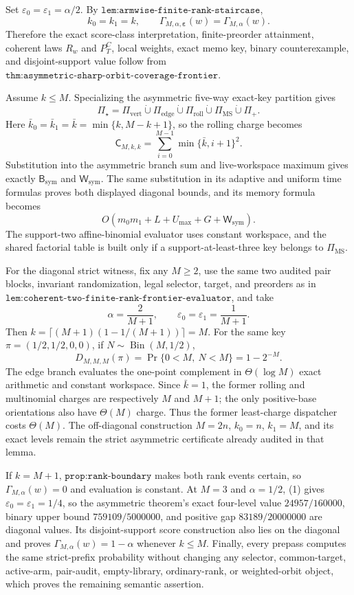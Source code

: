 Set \(\varepsilon_0=\varepsilon_1=\alpha/2\). By \(\texttt{lem:armwise-finite-rank-staircase}\),
\[
k_0=k_1=k,\qquad \Gamma_{M,\alpha,\boldsymbol\varepsilon}(w)=\Gamma_{M,\alpha}(w).
\tag{1}
\]
Therefore the exact score-class interpretation, finite-preorder attainment, coherent laws \(R_w\) and \(P_T^C\), local weights, exact memo key, binary counterexample, and disjoint-support value follow from \(\texttt{thm:asymmetric-sharp-orbit-coverage-frontier}\).

Assume \(k\le M\). Specializing the asymmetric five-way exact-key partition gives
\[
\Pi_\star=\Pi_{\mathrm{vert}}\mathbin{\dot\cup}\Pi_{\mathrm{edge}}\mathbin{\dot\cup}\Pi_{\mathrm{roll}}\mathbin{\dot\cup}\Pi_{\mathrm{MS}}\mathbin{\dot\cup}\Pi_+.
\tag{2}
\]
Here \(\bar k_0=\bar k_1=\bar k=\min\{k,M-k+1\}\), so the rolling charge becomes
\[
\mathsf C_{M,k,k}=\sum_{i=0}^{M-1}\min\{\bar k,i+1\}^2.
\tag{3}
\]
Substitution into the asymmetric branch sum and live-workspace maximum gives exactly \(\mathsf B_{\mathrm{sym}}\) and \(\mathsf W_{\mathrm{sym}}\). The same substitution in its adaptive and uniform time formulas proves both displayed diagonal bounds, and its memory formula becomes
\[
O(m_0m_1+L+U_{\max}+G+\mathsf W_{\mathrm{sym}}).
\tag{4}
\]
The support-two affine-binomial evaluator uses constant workspace, and the shared factorial table is built only if a support-at-least-three key belongs to \(\Pi_{\mathrm{MS}}\).

For the diagonal strict witness, fix any \(M\ge2\), use the same two audited pair blocks, invariant randomization, legal selector, target, and preorders as in \(\texttt{lem:coherent-two-finite-rank-frontier-evaluator}\), and take
\[
\alpha=\frac{2}{M+1},\qquad \varepsilon_0=\varepsilon_1=\frac1{M+1}.
\tag{5}
\]
Then \(k=\lceil(M+1)(1-1/(M+1))\rceil=M\). For the same key \(\pi=(1/2,1/2,0,0)\), if \(N\sim\operatorname{Bin}(M,1/2)\),
\[
D_{M,M,M}(\pi)=\Pr\{0<M,\ N<M\}=1-2^{-M}.
\tag{6}
\]
The edge branch evaluates the one-point complement in \(\Theta(\log M)\) exact arithmetic and constant workspace. Since \(\bar k=1\), the former rolling and multinomial charges are respectively \(M\) and \(M+1\); the only positive-base orientations also have \(\Theta(M)\) charge. Thus the former least-charge dispatcher costs \(\Theta(M)\). The off-diagonal construction \(M=2n\), \(k_0=n\), \(k_1=M\), and its exact levels remain the strict asymmetric certificate already audited in that lemma.

If \(k=M+1\), \(\texttt{prop:rank-boundary}\) makes both rank events certain, so \(\Gamma_{M,\alpha}(w)=0\) and evaluation is constant. At \(M=3\) and \(\alpha=1/2\), (1) gives \(\varepsilon_0=\varepsilon_1=1/4\), so the asymmetric theorem's exact four-level value \(24957/160000\), binary upper bound \(759109/5000000\), and positive gap \(83189/20000000\) are diagonal values. Its disjoint-support score construction also lies on the diagonal and proves \(\Gamma_{M,\alpha}(w)=1-\alpha\) whenever \(k\le M\). Finally, every prepass computes the same strict-prefix probability without changing any selector, common-target, active-arm, pair-audit, empty-library, ordinary-rank, or weighted-orbit object, which proves the remaining semantic assertion.